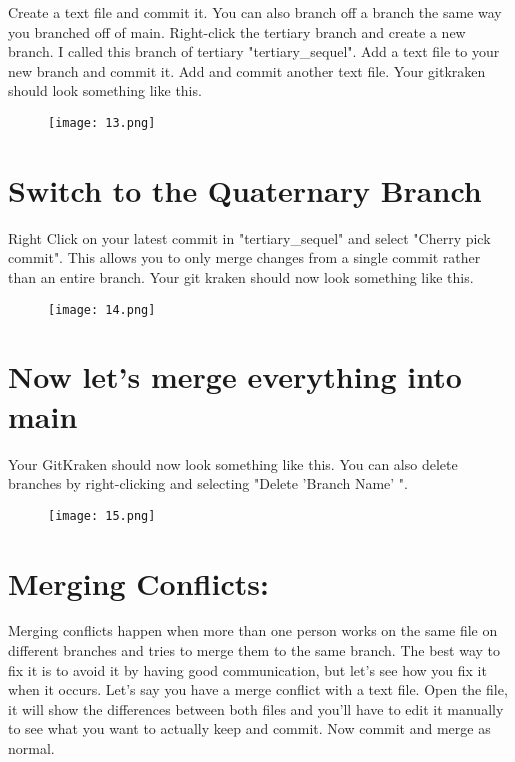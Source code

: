 \documentclass[10pt,twocolumn]{article}
\begin{document}
Create a text file and commit it. You can also branch off a branch the same way you branched off of main. Right-click the tertiary branch and create a new branch. I called this branch of tertiary "tertiary\_sequel". Add a text file to your new branch and commit it. Add and commit another text file. Your gitkraken should look something like this.

\begin{figure}[htbp]
\centering
\texttt{[image: 13.png]}
\label{fig:my_label}
\end{figure}

\section{Switch to the Quaternary Branch}

Right Click on your latest commit in "tertiary\_sequel" and select "Cherry pick commit". This allows you to only merge changes from a single commit rather than an entire branch. Your git kraken should now look something like this.

\begin{figure}[htbp]
\centering
\texttt{[image: 14.png]}
\label{fig:my_label}
\end{figure}

\section{Now let's merge everything into main}

Your GitKraken should now look something like this. You can also delete branches by right-clicking and selecting "Delete 'Branch Name' ".

\begin{figure}[htbp]
\centering
\texttt{[image: 15.png]}
\label{fig:my_label}
\end{figure}

\section{Merging Conflicts:}

Merging conflicts happen when more than one person works on the same file on different branches and tries to merge them to the same branch. The best way to fix it is to avoid it by having good communication, but let's see how you fix it when it occurs. Let's say you have a merge conflict with a text file. Open the file, it will show the differences between both files and you'll have to edit it manually to see what you want to actually keep and commit. Now commit and merge as normal.
\end{document}
